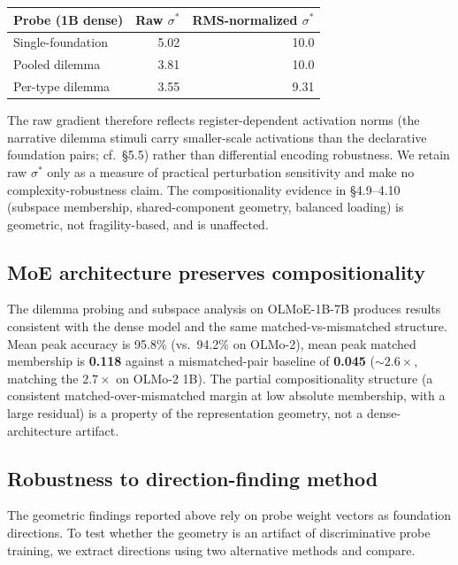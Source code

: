 {\def\LTcaptype{none} %
\begin{longtable}[]{@{}lrr@{}}
\toprule\noalign{}
Probe (1B dense) & Raw \(\sigma^*\) & RMS-normalized \(\sigma^*\) \\
\midrule\noalign{}
\endhead
\bottomrule\noalign{}
\endlastfoot
Single-foundation & 5.02 & 10.0 \\
Pooled dilemma & 3.81 & 10.0 \\
Per-type dilemma & 3.55 & 9.31 \\
\end{longtable}
}

The raw gradient therefore reflects register-dependent activation norms
(the narrative dilemma stimuli carry smaller-scale activations than the
declarative foundation pairs; cf.~\S5.5) rather than differential
encoding robustness. We retain raw \(\sigma^*\) only as a measure of
practical perturbation sensitivity and make no complexity-robustness
claim. The compositionality evidence in \S4.9--4.10 (subspace membership,
shared-component geometry, balanced loading) is geometric, not
fragility-based, and is unaffected.

\subsection{MoE architecture preserves compositionality}\label{moe-architecture-preserves-compositionality}

The dilemma probing and subspace analysis on OLMoE-1B-7B produces
results consistent with the dense model and the same matched-vs-mismatched
structure. Mean peak accuracy is 95.8\% (vs.~94.2\% on OLMo-2), mean
peak matched membership is \textbf{0.118} against a mismatched-pair baseline
of \textbf{0.045} (\({\sim}2.6\times\), matching the \(2.7\times\) on OLMo-2 1B).
The partial compositionality structure (a consistent matched-over-mismatched
margin at low absolute membership, with a large residual) is a property of
the representation geometry, not a dense-architecture artifact.

\subsection{Robustness to direction-finding method}\label{robustness-to-direction-finding-method}

The geometric findings reported above rely on probe weight vectors
as foundation directions. To test whether the geometry is an
artifact of discriminative probe training, we extract directions
using two alternative methods and compare.

